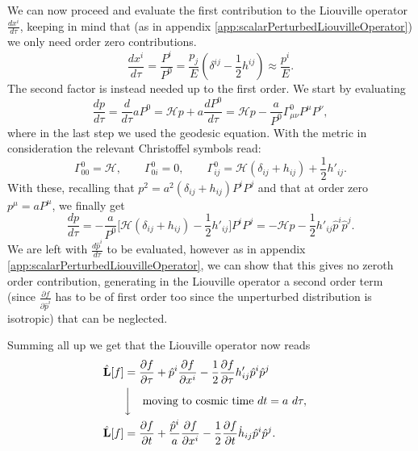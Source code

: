 We can now proceed and evaluate the first contribution to the Liouville operator $\frac{dx^i}{d\tau}$, keeping in mind that (as in appendix \ref{app:scalarPerturbedLiouvilleOperator}) we only need order zero contributions.
\begin{equation}\label{eq:B.4}
    \frac{dx^i}{d\tau}=\frac{P^i}{P^0}=\frac{p_j}{E}(\delta^{ij}-\frac{1}{2}h^{ij})\approx\frac{p^i}{E}.
\end{equation}
The second factor is instead needed up to the first order. We start by evaluating
$$\frac{dp}{d\tau}=\frac{d}{d\tau}aP^0=\mathcal{H} p+a\frac{dP^0}{d\tau}=\mathcal{H} p-\frac{a}{P^0}\Gamma^0_{\mu\nu}P^\mu P^\nu,$$
where in the last step we used the geodesic equation. With the metric in consideration the relevant Christoffel symbols read:
$$\Gamma^0_{00}=\mathcal{H},\qquad \Gamma^0_{0i}=0,\qquad\Gamma^{0}_{ij}=\mathcal{H} (\delta_{ij}+h_{ij})+\frac{1}{2}h'_{ij}.$$
With these, recalling that $p^2=a^2(\delta_{ij}+h_{ij})P^i P^j$ and that at order zero $p^\mu=aP^\mu$, we finally get
\begin{equation}\label{eq:B.5}
   \frac{dp}{d\tau}=-\frac{a}{P^0}\bigg[\mathcal{H} (\delta_{ij}+h_{ij})-\frac{1}{2}h'_{ij}\bigg]P^i P^j=-\mathcal{H}p-\frac{1}{2}h'_{ij}\hat p^i\hat p^j.
\end{equation}
We are left with $\frac{d\hat p^i}{d\tau}$ to be evaluated, however as in appendix \ref{app:scalarPerturbedLiouvilleOperator}, we can show that this gives no zeroth order contribution, generating in the Liouville operator a second order term (since $\frac{\partial f}{\partial\hat p^i}$ has to be of first order too since the unperturbed distribution is isotropic) that can be neglected.

Summing all up we get that the Liouville operator now reads
\begin{align}\label{eq:tensorPerturbedLiouvilleOperator}
   \hat{\mathbf{L}}[f]&=\frac{\partial f}{\partial\tau}+\hat p^i\frac{\partial f}{\partial x^i}-\frac{1}{2}\frac{\partial f}{\partial \tau}h'_{ij}\hat p^i\hat p^j\nonumber&&\\
   &\bigg\downarrow\quad\text{moving to cosmic time } dt=a\ d\tau,\nonumber&&\\
   \hat{\mathbf{L}}[f]&=\frac{\partial f}{\partial t}+\frac{\hat p^i}{a}\frac{\partial f}{\partial x^i}-\frac{1}{2}\frac{\partial f}{\partial t}\dot{h}_{ij}\hat p^i\hat p^j.&&
\end{align}
